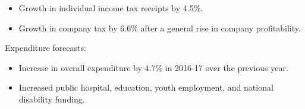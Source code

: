 \documentclass[a4paper,11pt]{article}
\begin{document}
\begin{itemize}
\item Growth in individual income tax receipts by 4.5\%.
\item Growth in company tax by 6.6\% after a general rise in company
	profitability.
\end{itemize}

Expenditure forecasts:

\begin{itemize}
\item Increase in overall expenditure by 4.7\% in 2016-17 over the previous
	year.
\item Increased public hospital, education, youth employment, and national
	disability funding.
\end{itemize}
\end{document}
